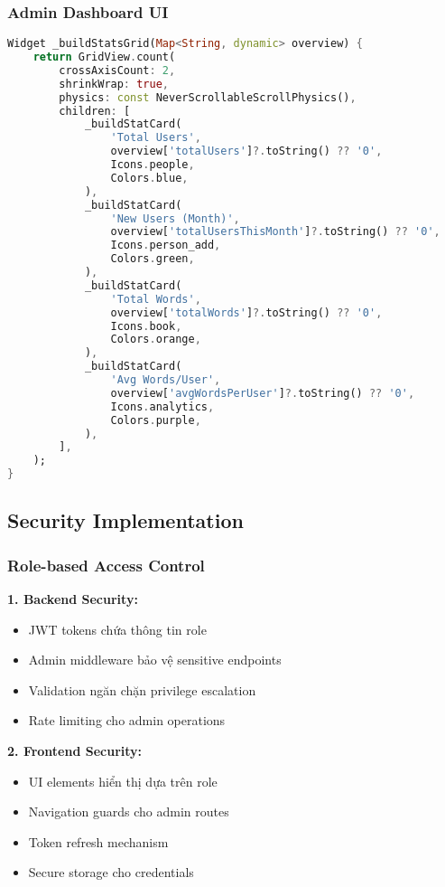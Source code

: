 \documentclass[12pt,a4paper]{article}
\begin{document}
\subsubsection{Admin Dashboard UI}

\begin{lstlisting}[language=Dart, caption=Dashboard Statistics Grid]
Widget _buildStatsGrid(Map<String, dynamic> overview) {
    return GridView.count(
        crossAxisCount: 2,
        shrinkWrap: true,
        physics: const NeverScrollableScrollPhysics(),
        children: [
            _buildStatCard(
                'Total Users',
                overview['totalUsers']?.toString() ?? '0',
                Icons.people,
                Colors.blue,
            ),
            _buildStatCard(
                'New Users (Month)',
                overview['totalUsersThisMonth']?.toString() ?? '0',
                Icons.person_add,
                Colors.green,
            ),
            _buildStatCard(
                'Total Words',
                overview['totalWords']?.toString() ?? '0',
                Icons.book,
                Colors.orange,
            ),
            _buildStatCard(
                'Avg Words/User',
                overview['avgWordsPerUser']?.toString() ?? '0',
                Icons.analytics,
                Colors.purple,
            ),
        ],
    );
}
\end{lstlisting}

\subsection{Security Implementation}

\subsubsection{Role-based Access Control}

\textbf{1. Backend Security:}
\begin{itemize}
    \item JWT tokens chứa thông tin role
    \item Admin middleware bảo vệ sensitive endpoints
    \item Validation ngăn chặn privilege escalation
    \item Rate limiting cho admin operations
\end{itemize}

\textbf{2. Frontend Security:}
\begin{itemize}
    \item UI elements hiển thị dựa trên role
    \item Navigation guards cho admin routes
    \item Token refresh mechanism
    \item Secure storage cho credentials
\end{itemize}
\end{document}
